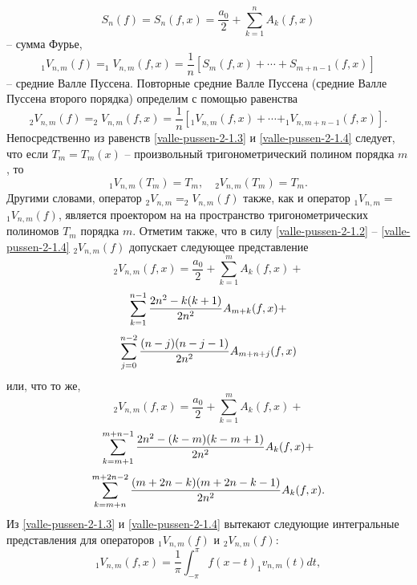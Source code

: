 \begin{equation} \label{valle-pussen-2-1.2}
 S_n(f)=   S_n(f,x)=\frac{a_0}{2}+ \sum_{k=1}^n A_k(f,x)
\end{equation}
-- сумма Фурье,
\begin{equation}\label{valle-pussen-2-1.3}
 _1V_{n,m}(f)= _1V_{n,m}(f,x)=\frac1{n}[S_m(f,x)+\cdots+S_{m+n-1}(f,x)]
\end{equation}
-- средние Валле Пуссена. Повторные средние Валле Пуссена (средние Валле Пуссена второго порядка) определим с помощью равенства
\begin{equation}\label{valle-pussen-2-1.4}
 _2V_{n,m}(f)= _2V_{n,m}(f,x)=\frac1{n}[ _1V_{n,m}(f,x)+\cdots+ _1V_{n,m+n-1}(f,x)].
\end{equation}
Непосредственно из равенств \eqref{valle-pussen-2-1.3} и \eqref{valle-pussen-2-1.4} следует, что если $T_m=T_m(x)$ -- произвольный тригонометрический полином порядка $m$, то
\begin{equation}\label{valle-pussen-2-1.5}
 _1V_{n,m}(T_m)=T_m, \quad _2V_{n,m}(T_m)=T_m.
\end{equation}
Другими словами, оператор $_2V_{n,m}=_2V_{n,m}(f)$ также, как и оператор $_1V_{n,m}=$ $_1V_{n,m}(f)$, является проектором на на пространство тригонометрических полиномов $T_m$ порядка $m$. Отметим также, что в силу \eqref{valle-pussen-2-1.2} -- \eqref{valle-pussen-2-1.4} $ _2V_{n,m}(f)$ допускает следующее представление
$$
 _2V_{n,m}(f,x)=\frac{a_0}{2}+ \sum_{k=1}^m A_k(f,x)+
$$
$$
 \sum_{k=1}^{n-1}{2n^2-k(k+1)\over2n^2}A_{m+k}(f,x)+
$$
$$
 \sum_{j=0}^{n-2}{(n-j)(n-j-1)\over2n^2}A_{m+n+j}(f,x)
$$
или, что то же,
$$
 _2V_{n,m}(f,x)=\frac{a_0}{2}+ \sum_{k=1}^m A_k(f,x)+
$$
$$
 \sum_{k=m+1}^{m+n-1}{2n^2-(k-m)(k-m+1)\over2n^2}A_{k}(f,x)+
$$
\begin{equation}\label{valle-pussen-2-1.6}
 \sum_{k=m+n}^{m+2n-2}{(m+2n-k)(m+2n-k-1)\over2n^2}A_{k}(f,x).
\end{equation}
Из \eqref{valle-pussen-2-1.3} и \eqref{valle-pussen-2-1.4} вытекают следующие интегральные представления для операторов
$_1V_{n,m}(f)$ и $_2V_{n,m}(f)$:
\begin{equation}\label{valle-pussen-2-1.7}
 _1V_{n,m}(f,x)=\frac{1}{\pi}\int_{-\pi}^\pi f(x-t)_1v_{n,m}(t)dt,
 \end{equation}

